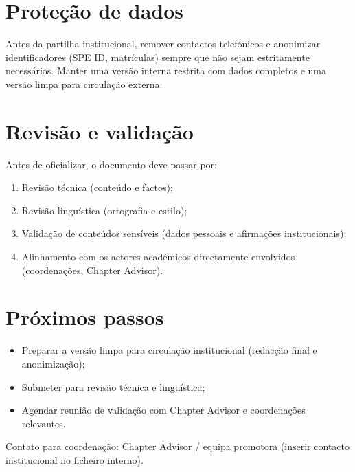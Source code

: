 \documentclass[11pt,a4paper]{article}
\begin{document}
\section{Proteção de dados}
Antes da partilha institucional, remover contactos telefónicos e anonimizar identificadores (SPE ID, matrículas) sempre que não sejam estritamente necessários. Manter uma versão interna restrita com dados completos e uma versão limpa para circulação externa.

\section{Revisão e validação}
Antes de oficializar, o documento deve passar por:
\begin{enumerate}[leftmargin=1.0cm]
  \item Revisão técnica (conteúdo e factos); 
  \item Revisão linguística (ortografia e estilo); 
  \item Validação de conteúdos sensíveis (dados pessoais e afirmações institucionais);
  \item Alinhamento com os actores académicos directamente envolvidos (coordenações, Chapter Advisor).
\end{enumerate}

\section*{Próximos passos}
\begin{itemize}[leftmargin=1.0cm]
  \item Preparar a versão limpa para circulação institucional (redacção final e anonimização);
  \item Submeter para revisão técnica e linguística; 
  \item Agendar reunião de validação com Chapter Advisor e coordenações relevantes.
\end{itemize}

\vspace{1em}
\noindent Contato para coordenação: Chapter Advisor / equipa promotora (inserir contacto institucional no ficheiro interno).
\end{document}
